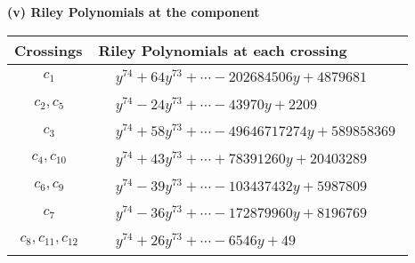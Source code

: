 \documentclass[1p]{elsarticle_modified}
\theoremstyle{definition}
\begin{document}
\flushleft \textbf{(v) Riley Polynomials at the component}\newline \\
\begin{tabular}{m{50pt}|m{274pt}}
Crossings & \hspace{64pt}Riley Polynomials at each crossing \\
\hline $$\begin{aligned}c_{1}\end{aligned}$$&$\begin{aligned}
&y^{74}+64 y^{73}+\cdots-202684506 y+4879681
\end{aligned}$\\
\hline $$\begin{aligned}c_{2},c_{5}\end{aligned}$$&$\begin{aligned}
&y^{74}-24 y^{73}+\cdots-43970 y+2209
\end{aligned}$\\
\hline $$\begin{aligned}c_{3}\end{aligned}$$&$\begin{aligned}
&y^{74}+58 y^{73}+\cdots-49646717274 y+589858369
\end{aligned}$\\
\hline $$\begin{aligned}c_{4},c_{10}\end{aligned}$$&$\begin{aligned}
&y^{74}+43 y^{73}+\cdots+78391260 y+20403289
\end{aligned}$\\
\hline $$\begin{aligned}c_{6},c_{9}\end{aligned}$$&$\begin{aligned}
&y^{74}-39 y^{73}+\cdots-103437432 y+5987809
\end{aligned}$\\
\hline $$\begin{aligned}c_{7}\end{aligned}$$&$\begin{aligned}
&y^{74}-36 y^{73}+\cdots-172879960 y+8196769
\end{aligned}$\\
\hline $$\begin{aligned}c_{8},c_{11},c_{12}\end{aligned}$$&$\begin{aligned}
&y^{74}+26 y^{73}+\cdots-6546 y+49
\end{aligned}$\\
\hline
\end{tabular}\\~\\
\end{document}
